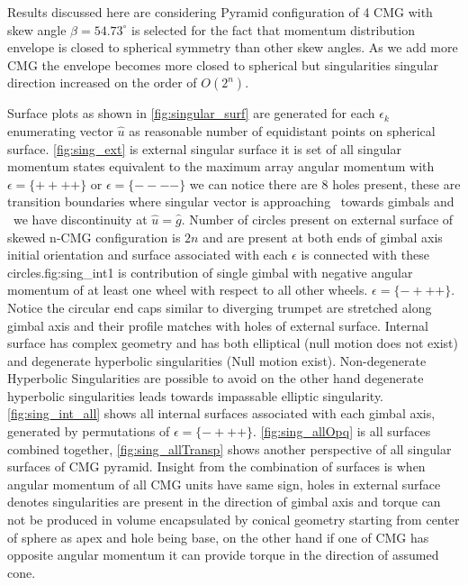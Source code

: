 Results discussed here are considering Pyramid configuration of 4 CMG with skew angle $\beta =54.73^{ \circ }$ is selected for the fact that momentum distribution envelope is closed to spherical symmetry than other skew angles.\cite{ABaker2020} As we add more CMG the envelope becomes more closed to spherical but singularities singular direction increased on the order of $\displaystyle O \left( 2^{n}\right)$.

Surface plots as shown in \autoref{fig:singular_surf} are generated for each ${\displaystyle \epsilon _{k}}$ enumerating vector ${\displaystyle \hat{u}}$ as reasonable number of equidistant points on spherical surface. \autoref{fig:sing_ext} is external singular surface it is set of all singular momentum states equivalent to the maximum array angular momentum with $\epsilon =\{++++\}$ or $\epsilon =\{----\}$ we can notice there are 8 holes present, these are transition boundaries where singular vector is approaching \ towards gimbals and \ we have discontinuity at ${\displaystyle \hat{u} =\hat{g}}$. Number of circles present on external surface of skewed n-CMG configuration is ${\displaystyle 2n}$ and are present at both ends of gimbal axis initial orientation and surface associated with each $\displaystyle \epsilon $ is connected with these circles.fig:sing\_int1 is contribution of single gimbal with negative angular momentum of at least one wheel with respect to all other wheels. $\epsilon =\{-+++\}$. Notice the circular end caps similar to diverging trumpet are stretched along gimbal axis and their profile matches with holes of external surface. Internal surface has complex geometry and has both elliptical (null motion does not exist) and degenerate hyperbolic singularities (Null motion exist). Non-degenerate Hyperbolic Singularities are possible to avoid on the other hand degenerate hyperbolic singularities leads towards impassable elliptic singularity. \autoref{fig:sing_int_all} shows all internal surfaces associated with each gimbal axis, generated by permutations of $\epsilon =\{-+++\}$. \autoref{fig:sing_allOpq} is all surfaces combined together, \autoref{fig:sing_allTransp} shows another perspective of all singular surfaces of CMG pyramid. Insight from the combination of surfaces is when angular momentum of all CMG units have same sign, holes in external surface denotes singularities are present in the direction of gimbal axis and torque can not be produced in volume encapsulated by conical geometry starting from center of sphere as apex and hole being base, on the other hand if one of CMG has opposite angular momentum it can provide torque in the direction of assumed cone.

